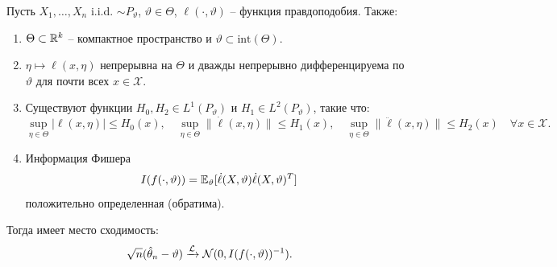 \begin{thm} \label{Asymptotic efficiency ML estimators}
	Пусть $X_1, \dots, X_n$ i.i.d. $\sim P_\vartheta$, $\vartheta \in \Theta$, $\ell(\cdot, \vartheta)$ -- функция правдоподобия. Также:
	\begin{enumerate}
		\item $\Theta \subset \mathbb{R}^k$ -- компактное пространство и $\vartheta \subset \mathrm{int}(\Theta)$.
		\item $\eta \mapsto \ell(x, \eta) $ непрерывна на $\Theta$ и дважды непрерывно дифференцируема по $\vartheta$ для почти всех $x \in \mathcal{X}$.
		\item Существуют функции $H_0, H_2 \in L^1(P_\vartheta)$ и $H_1 \in L^2(P_\vartheta)$, такие что:
		\[ \sup_{\eta \in \Theta} |\ell(x, \eta)| \leq H_0(x), \quad \sup_{\eta \in \Theta} \|\dot{\ell}(x, \eta)\| \leq H_1(x), \quad \sup_{\eta \in \Theta} \|\ddot{\ell}(x, \eta)\| \leq H_2(x) \quad \forall x \in \mathcal{X}. \]
		\item Информация Фишера
		\[ I(f(\cdot, \vartheta))=\mathbb{E}_\vartheta[\dot{\ell}(X,\vartheta)\dot{\ell}(X,\vartheta)^T] \]
		положительно определенная (обратима).
	\end{enumerate}
	Тогда имеет место сходимость:
	\[ \sqrt{n}(\hat{\theta}_n-\vartheta) \xrightarrow{\mathcal{L}} \mathcal{N}(0, I(f(\cdot, \vartheta))^{-1}). \]
\end{thm}
